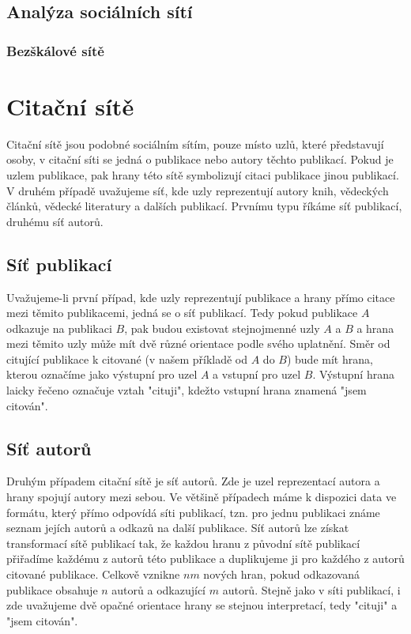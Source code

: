 \documentclass[12pt,titlepage]{report}
\begin{document}
\subsection{Analýza sociálních sítí}
\subsubsection{Bezškálové sítě}

\section{Citační sítě}
Citační sítě jsou podobné sociálním sítím, pouze místo uzlů, které představují
osoby, v citační síti se jedná o publikace nebo autory těchto publikací.  Pokud
je uzlem publikace, pak hrany této sítě symbolizují citaci publikace jinou
publikací. V druhém případě uvažujeme síť, kde uzly reprezentují autory knih,
vědeckých článků, vědecké literatury a dalších publikací. Prvnímu typu říkáme
síť publikací, druhému síť autorů.

\subsection{Síť publikací}
Uvažujeme-li první případ, kde uzly reprezentují publikace a hrany přímo citace
mezi těmito publikacemi, jedná se o síť publikací. Tedy pokud publikace $A$
odkazuje na publikaci $B$, pak budou existovat stejnojmenné uzly $A$ a $B$ a
hrana mezi těmito uzly může mít dvě různé orientace podle svého uplatnění. Směr
od citující publikace k citované (v našem příkladě od $A$ do $B$) bude mít
hrana, kterou označíme jako výstupní pro uzel $A$ a vstupní pro uzel $B$.
Výstupní hrana laicky řečeno označuje vztah "cituji", kdežto vstupní hrana
znamená "jsem citován".

\subsection{Síť autorů}
Druhým případem citační sítě je síť autorů. Zde je uzel reprezentací autora a
hrany spojují autory mezi sebou. Ve většině případech máme k dispozici data ve
formátu, který přímo odpovídá síti publikací, tzn. pro jednu publikaci známe
seznam jejích autorů a odkazů na další publikace. Síť autorů lze získat
transformací sítě publikací tak, že každou hranu z původní sítě publikací
přiřadíme každému z autorů této publikace a duplikujeme ji pro každého z autorů
citované publikace. Celkově vznikne $nm$ nových hran, pokud odkazovaná
publikace obsahuje $n$ autorů a odkazující $m$ autorů. Stejně jako v síti
publikací, i zde uvažujeme dvě opačné orientace hrany se stejnou interpretací,
tedy "cituji" a "jsem citován". 
\end{document}
